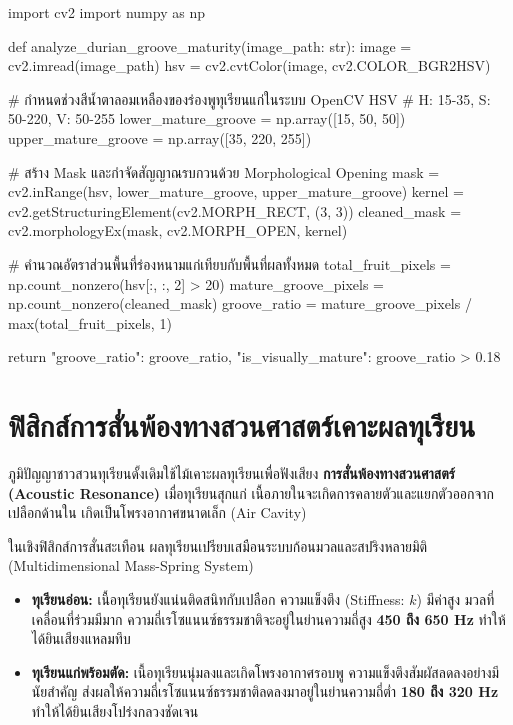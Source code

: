 \begin{pythonbox}
import cv2
import numpy as np

def analyze_durian_groove_maturity(image_path: str):
    image = cv2.imread(image_path)
    hsv = cv2.cvtColor(image, cv2.COLOR_BGR2HSV)
    
    # กำหนดช่วงสีน้ำตาลอมเหลืองของร่องพูทุเรียนแก่ในระบบ OpenCV HSV
    # H: 15-35, S: 50-220, V: 50-255
    lower_mature_groove = np.array([15, 50, 50])
    upper_mature_groove = np.array([35, 220, 255])
    
    # สร้าง Mask และกำจัดสัญญาณรบกวนด้วย Morphological Opening
    mask = cv2.inRange(hsv, lower_mature_groove, upper_mature_groove)
    kernel = cv2.getStructuringElement(cv2.MORPH_RECT, (3, 3))
    cleaned_mask = cv2.morphologyEx(mask, cv2.MORPH_OPEN, kernel)
    
    # คำนวณอัตราส่วนพื้นที่ร่องหนามแก่เทียบกับพื้นที่ผลทั้งหมด
    total_fruit_pixels = np.count_nonzero(hsv[:, :, 2] > 20)
    mature_groove_pixels = np.count_nonzero(cleaned_mask)
    groove_ratio = mature_groove_pixels / max(total_fruit_pixels, 1)
    
    return {
        "groove_ratio": groove_ratio,
        "is_visually_mature": groove_ratio > 0.18
    }
\end{pythonbox}

\section{ฟิสิกส์การสั่นพ้องทางสวนศาสตร์เคาะผลทุเรียน}

ภูมิปัญญาชาวสวนทุเรียนดั้งเดิมใช้ไม้เคาะผลทุเรียนเพื่อฟังเสียง \textbf{การสั่นพ้องทางสวนศาสตร์ (Acoustic Resonance)} เมื่อทุเรียนสุกแก่ เนื้อภายในจะเกิดการคลายตัวและแยกตัวออกจากเปลือกด้านใน เกิดเป็นโพรงอากาศขนาดเล็ก (Air Cavity) 

ในเชิงฟิสิกส์การสั่นสะเทือน ผลทุเรียนเปรียบเสมือนระบบก้อนมวลและสปริงหลายมิติ (Multidimensional Mass-Spring System)
\begin{itemize}[leftmargin=1.5em]
    \item \textbf{ทุเรียนอ่อน:} เนื้อทุเรียนยังแน่นติดสนิทกับเปลือก ความแข็งตึง (Stiffness: $k$) มีค่าสูง มวลที่เคลื่อนที่ร่วมมีมาก ความถี่เรโซแนนซ์ธรรมชาติจะอยู่ในย่านความถี่สูง \textbf{450 ถึง 650 Hz} ทำให้ได้ยินเสียงแหลมทึบ
    \item \textbf{ทุเรียนแก่พร้อมตัด:} เนื้อทุเรียนนุ่มลงและเกิดโพรงอากาศรอบพู ความแข็งตึงสัมผัสลดลงอย่างมีนัยสำคัญ ส่งผลให้ความถี่เรโซแนนซ์ธรรมชาติลดลงมาอยู่ในย่านความถี่ต่ำ \textbf{180 ถึง 320 Hz} ทำให้ได้ยินเสียงโปร่งกลวงชัดเจน
\end{itemize}

